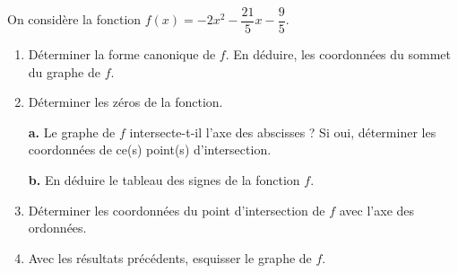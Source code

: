 \documentclass{beamer}
\begin{document}
\begin{frame}{}
On considère la fonction $f(x)=-2x^2-\dfrac{21}{5}x-\dfrac{9}{5}$.

\begin{enumerate}
	\item Déterminer la forme canonique de $f$. En déduire, les coordonnées du sommet du graphe de $f$.
	\item Déterminer les zéros de la fonction.

\medskip
\textbf {a.}  Le graphe de $f$ intersecte-t-il l'axe des abscisses ? Si oui, déterminer les coordonnées de ce(s) point(s) d'intersection.

\medskip
\textbf {b.}  En déduire le tableau des signes de la fonction $f$.
	\item Déterminer les coordonnées du point d'intersection de $f$ avec l'axe des ordonnées.
	\item Avec les résultats précédents, esquisser le graphe de $f$.
\end{enumerate}
\end{frame}
\end{document}
